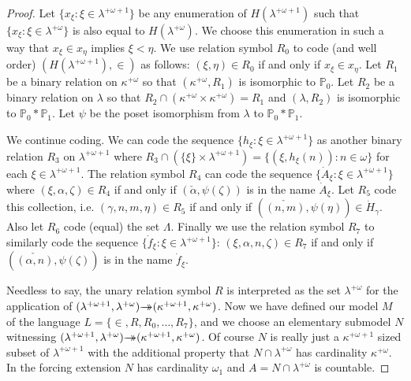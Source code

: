 \documentclass{amsart}
\theoremstyle{plain}
\theoremstyle{definition}
\theoremstyle{remark}
\theoremstyle{plain}
\theoremstyle{definition}
\theoremstyle{remark}
\begin{document}
\begin{proof}
          Let $\{ x_\xi : \xi\in \lambda^{+\omega+1}\}$ be any enumeration of
           $H(\lambda^{+\omega+1})$  such that
           $\{ x_\xi : \xi\in \lambda^{+\omega}\}$ is also equal to
           $H(\lambda^{+\omega})$. We choose this enumeration in such a way that
           $x_\xi\in x_\eta$ implies $\xi<\eta$.
          We use relation symbol $R_0$ to code
          (and well order)
           $(H(\lambda^{+\omega+1}), \in)$ as follows: $(\xi,\eta)\in R_0$
          if and only if $x_\xi\in x_\eta$.
          Let $R_1$ be a binary relation on $\kappa^{+\omega}$ so that
          $(\kappa^{+\omega},R_1)$ is isomorphic to $\mathbb P_0$. Let
           $R_2$ be a binary relation on $\lambda$ so that
           $R_2\cap (\kappa^{+\omega}\times \kappa^{+\omega})=R_1$ and
           $(\lambda,R_2)$ is isomorphic to $\mathbb P_0*\mathbb P_1$.
          Let $\psi$ be the poset isomorphism from $\lambda$ to
           $\mathbb P_0*\mathbb P_1$.

          We continue coding. We can code the sequence
           $\{ h_\xi : \xi\in \lambda^{+\omega+1}\}$ as another binary  relation
           $R_3$ on $\lambda^{+\omega+1}$ where $R_3\cap \left(\{\xi\}\times
           \lambda^{+\omega+1}\right) = \{ (\xi,h_\xi(n) ) : n\in \omega\}$
          for each $\xi\in \lambda^{+\omega+1}$. The relation symbol $R_4$ can
          code the sequence $\{ \dot A_\xi : \xi \in \lambda^{+\omega+1}\}$
          where $(\xi, \alpha, \zeta) \in R_4$ if and only if
          $(\check \alpha, \psi(\zeta))$ is in the name $\dot A_\xi$.
           Let $R_5$ code this collection, i.e.
           $(\gamma,n,m,\eta)\in R_5$ if and only if
           $(\check{(n,m)}, \psi(\eta))\in \dot H_\gamma$. Also let $R_6$ code
           (equal)  the set $\Lambda$.
          Finally we use the relation symbol $R_7$ to similarly code the
          sequence $\{ \dot f_\xi  : \xi \in \lambda^{+\omega+1}\}$:
           $(\xi, \alpha, n, \zeta) \in R_7$ if and only if
          $(\check {(\alpha,n)}, \psi(\zeta))$ is in the name $\dot f_\xi$.

          Needless to say, the unary relation symbol $R$
          is interpreted as the set $\lambda^{+\omega}$ for the application of
          $(\lambda^{+\omega+1},\lambda^{+\omega})\rlap{$\rightarrow$}\,{\rightarrow}
          (\kappa^{+\omega+1},\kappa^{+\omega})$.
           Now  we have defined our model
          $M$  of the language $L= \{\in, R, R_0,\ldots, R_7\}$,
           and we choose an elementary submodel
          $N$ witnessing
          $(\lambda^{+\omega+1},\lambda^{+\omega})\rlap{$\rightarrow$}\,{\rightarrow}
          (\kappa^{+\omega+1},\kappa^{+\omega})$. Of course $N$ is really just
          a $\kappa^{+\omega+1}$ sized subset of $\lambda^{+\omega+1}$
          with the additional property that $N\cap \lambda^{+\omega}$ has
          cardinality $\kappa^{+\omega}$.  In the
          forcing extension $N$ has cardinality $\omega_1$ and
           $A= N\cap \lambda^{+\omega}$ is countable.


\end{proof}
\end{document}
